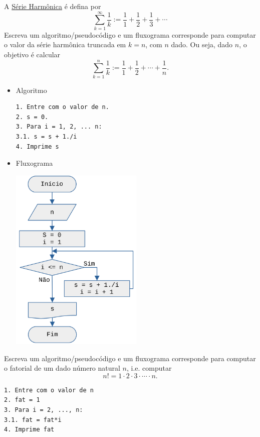 \begin{exer}
  A \href{https://pt.wikipedia.org/wiki/S%C3%A9rie_harm%C3%B3nica_(matem%C3%A1tica)}{Série Harmônica} é defina por
  \begin{equation}
    \sum_{k=1}^\infty\frac{1}{k} := \frac{1}{1} + \frac{1}{2} + \frac{1}{3} + \cdots
  \end{equation}
  Escreva um algoritmo/pseudocódigo e um fluxograma corresponde para computar o valor da série harmônica truncada em $k=n$, com $n$ dado. Ou seja, dado $n$, o objetivo é calcular
  \begin{equation}
    \sum_{k=1}^n\frac{1}{k} := \frac{1}{1} + \frac{1}{2} + \cdots + \frac{1}{n}.
  \end{equation}
\end{exer}
\begin{resp}
\begin{itemize}
  \item Algoritmo
  
\begin{verbatim}
1. Entre com o valor de n.
2. s = 0.
3. Para i = 1, 2, ... n:
3.1. s = s + 1./i
4. Imprime s
\end{verbatim}

  \item Fluxograma

  \includegraphics[width=2.5in]{./cap_lingua/dados/fig_resp_serieHarmonica/fig.png}

\end{itemize}
\end{resp}

\begin{exer}

  Escreva um algoritmo/pseudocódigo e um fluxograma corresponde para computar o fatorial de um dado número natural $n$, i.e. computar
  \begin{equation}
    n! = 1\cdot 2\cdot 3 \cdot \cdots \cdot n.
  \end{equation}
\end{exer}
\begin{resp}
  
\begin{verbatim}
1. Entre com o valor de n
2. fat = 1
3. Para i = 2, ..., n:
3.1. fat = fat*i
4. Imprime fat
\end{verbatim}

\end{resp}

